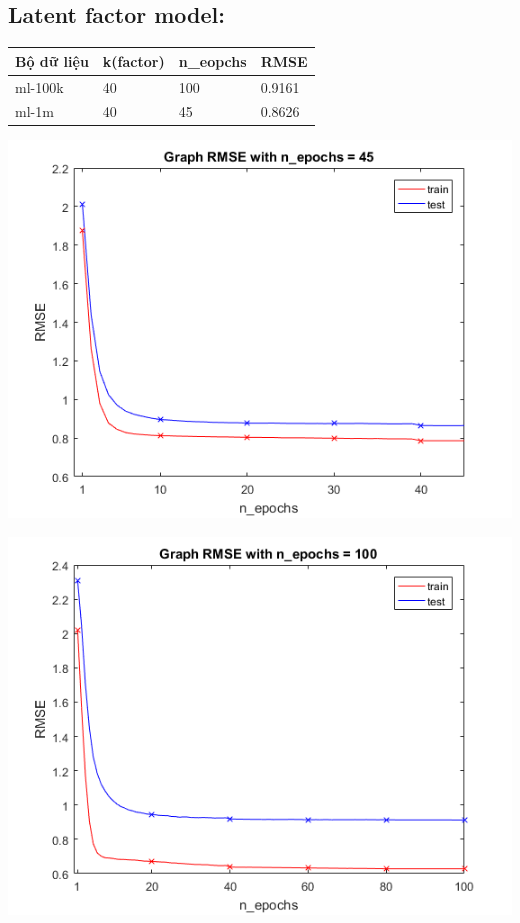 \documentclass[a0,portrait,11pt]{a0poster}
\begin{document}
\begin{mybox}
\begin{multicols}{3}
\subsection*{Latent factor model:}
\begin{center}
\begin{tabular}{|l|l|l|l|}
\hline
Bộ dữ liệu & k(factor) & n\_eopchs & RMSE \\
\hline
ml-100k & 40 & 100 & 0.9161 \\
ml-1m & 40 & 45 & 0.8626 \\
\hline
\end{tabular}
\end{center}
\begin{minipage}[c]{0.5\linewidth}
\includegraphics[width=1.0\linewidth]{RMSE!.png}
\end{minipage}
\begin{minipage}[c]{0.5\linewidth}
\includegraphics[width=1.0\linewidth]{RMSE.png}
\end{minipage}
\begin{minipage}[c]{0.5\linewidth}
\end{minipage}

\end{multicols}
\end{mybox}
\end{document}
